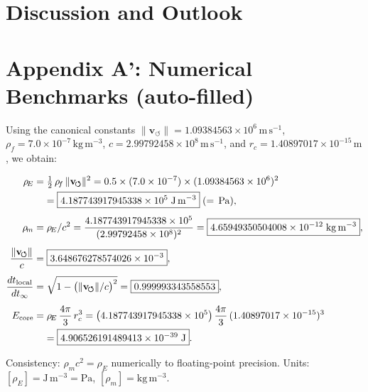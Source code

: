 \documentclass[11pt,a4paper]{article}
\begin{document}
\section{Discussion and Outlook}




\appendix
\section*{Appendix A': Numerical Benchmarks (auto-filled)}

Using the canonical constants
$\lVert\mathbf{v}_{\!\boldsymbol{\circlearrowleft}}\rVert=1.09384563\times10^6\,\mathrm{m\,s^{-1}}$,
$\rho_{\!f}=7.0\times10^{-7}\,\mathrm{kg\,m^{-3}}$,
$c=2.99792458\times10^8\,\mathrm{m\,s^{-1}}$, and
$r_c=1.40897017\times10^{-15}\,\mathrm{m}$, we obtain:

\begin{align}
\rho_{\!E} &= \tfrac{1}{2}\,\rho_{\!f}\,\lVert\mathbf{v}_{\!\boldsymbol{\circlearrowleft}}\rVert^2
= 0.5\times(7.0\times10^{-7})\times(1.09384563\times10^6)^2 \\
&\phantom{=}\;= \boxed{4.187743917945338\times10^{5}\;\mathrm{J\,m^{-3}}} \; (=\,\mathrm{Pa}),\\[4pt]
\rho_{\!m} &= \rho_{\!E}/c^2
= \dfrac{4.187743917945338\times10^{5}}{(2.99792458\times10^{8})^2}
= \boxed{4.65949350504008\times10^{-12}\;\mathrm{kg\,m^{-3}}},\\[4pt]
\frac{\lVert\mathbf{v}_{\!\boldsymbol{\circlearrowleft}}\rVert}{c}
&= \boxed{3.648676278574026\times10^{-3}},\\[4pt]
\frac{dt_{\rm local}}{dt_{\infty}}
&= \sqrt{1-\big(\lVert\mathbf{v}_{\!\boldsymbol{\circlearrowleft}}\rVert/c\big)^2}
= \boxed{0.999993343558553},\\[4pt]
E_{\rm core} &= \rho_{\!E}\,\dfrac{4\pi}{3}\,r_c^3
= \big(4.187743917945338\times10^{5}\big)\,\dfrac{4\pi}{3}\,(1.40897017\times10^{-15})^3 \\
&\phantom{=}\;= \boxed{4.906526191489413\times10^{-39}\;\mathrm{J}}.
\end{align}

Consistency: $\rho_{\!m} c^2 = \rho_{\!E}$ numerically to floating-point precision.
Units: $[\rho_{\!E}] = \mathrm{J\,m^{-3}} = \mathrm{Pa}$, $[\rho_{\!m}] = \mathrm{kg\,m^{-3}}$.
\end{document}
